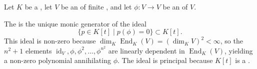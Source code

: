\begin{definition} \label{definition:minimal_polynomial_of_an_endomorphism_of_a_vector_space_over_a_field}
Let $K$ be a , let $V$ be an  of finite , and let $\phi : V \to V$ be an  of $V$.

The  is the unique monic generator of the ideal
$$\{p \in K[t] \mid p(\phi) = 0\} \subset K[t].$$
This ideal is non-zero because $\dim_K \operatorname{End}_K(V) = (\dim_K V)^2 < \infty$, so the $n^2 + 1$ elements $\operatorname{id}_V, \phi, \phi^2, \dots, \phi^{n^2}$ are linearly dependent in $\operatorname{End}_K(V)$, yielding a non-zero polynomial annihilating $\phi$. The ideal is principal because $K[t]$ is a .
\end{definition}

